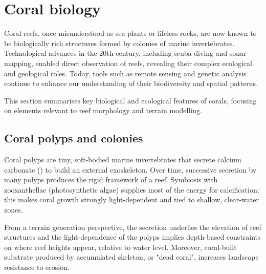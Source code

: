 


\section{Coral biology}
\label{sec:state-of-the-art_biology}

Coral reefs, once misunderstood as sea plants or lifeless rocks, are now known to be biologically rich structures formed by colonies of marine invertebrates. Technological advances in the 20th century, including scuba diving and sonar mapping, enabled direct observation of reefs, revealing their complex ecological and geological roles. Today, tools such as remote sensing and genetic analysis continue to enhance our understanding of their biodiversity and spatial patterns.

This section summarises key biological and ecological features of corals, focusing on elements relevant to reef morphology and terrain modelling.

\subsection{Coral polyps and colonies}
Coral polyps are tiny, soft-bodied marine invertebrates that secrete calcium carbonate () to build an external exoskeleton. Over time, successive secretion by many polyps produces the rigid framework of a reef. Symbiosis with zooxanthellae (photosynthetic algae) supplies most of the energy for calcification; this makes coral growth strongly light-dependent and tied to shallow, clear-water zones.

From a terrain generation perspective, the  secretion underlies the elevation of reef structures and the light-dependence of the polyps implies depth-based constraints on where reef heights appear, relative to water level. Moreover, coral-built substrate produced by accumulated skeleton, or "dead coral", increases landscape resistance to erosion.

